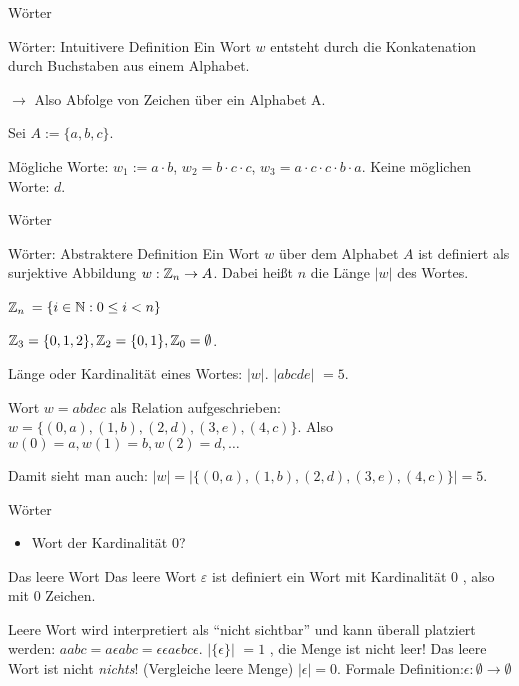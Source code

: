 \documentclass[handout]{beamer}
\begin{document}
\begin{frame}{Wörter}
	\begin{block}{Wörter: Intuitivere Definition}
		Ein Wort $w$ entsteht durch die Konkatenation durch Buchstaben aus einem Alphabet.
	\end{block}

	$\rightarrow$ Also Abfolge von Zeichen über ein Alphabet A.

	\pause Sei $A := \{a, b, c\}$.

	\begin{itemize}
		\pitem Mögliche Worte: \pause $w_1 := a \cdot b$\pause , $w_2 = b \cdot c \cdot c$\pause , $w_3 = a \cdot c \cdot c \cdot b \cdot a$.
		\pitem Keine möglichen Worte: \pause $d$.
		\end{itemize}
\end{frame}

\begin{frame}{Wörter}
	\begin{block}{Wörter: Abstraktere Definition}
		Ein Wort $w$  über dem Alphabet $A$  ist definiert als surjektive Abbildung  $w : \mathbb{Z}_n \rightarrow A$. Dabei heißt $n$ die Länge $|w|$ des Wortes.
	\end{block}

	\begin{itemize}
		\pitem $\mathbb{Z}_n$  $ = \{i \in \mathbb{N} : 0 \leq i < n \}$
		
		\pause $\mathbb{Z}_3  = \{0, 1, 2\},  \mathbb{Z}_2 = \{0, 1\}, \mathbb{Z}_0 = \emptyset$.
		
		\pitem Länge oder Kardinalität eines Wortes:  $|w|$. \pause $|abcde|$ $= 5$.
		
		\pitem Wort $w = abdec$ als Relation aufgeschrieben: \pause $w = \{(0, a), (1, b), (2, d), (3, e), (4, c)\}$.  Also $w(0) = a, w(1) = b, w(2) = d, \dots$
		
		\pause Damit sieht man auch: $|w| = |\{(0, a), (1, b), (2, d), (3, e), (4, c)\}| = 5$.
	\end{itemize}
\end{frame}

\begin{frame}{Wörter}
	\begin{itemize}
		\item Wort der Kardinalität 0?
	\end{itemize}

	\pause

	\begin{block}{Das leere Wort}
		Das leere Wort $\varepsilon$ ist definiert ein Wort mit Kardinalität 0 , also mit 0 Zeichen.
	\end{block}

	\begin{itemize}
		\pitem Leere Wort wird interpretiert als ``nicht sichtbar'' und kann überall platziert werden\pause : $aabc = a\epsilon abc = \epsilon\epsilon a\epsilon bc \epsilon$.
		\pitem $|\{\epsilon\}|$ \pause $ = 1$ , die Menge ist nicht leer! Das leere Wort ist nicht \emph{nichts}! (Vergleiche leere Menge)
		\pitem $|\epsilon| = 0$.
		\pitem Formale Definition:\pause $\epsilon : \emptyset \rightarrow \emptyset $
	\end{itemize}
\end{frame}
\end{document}
